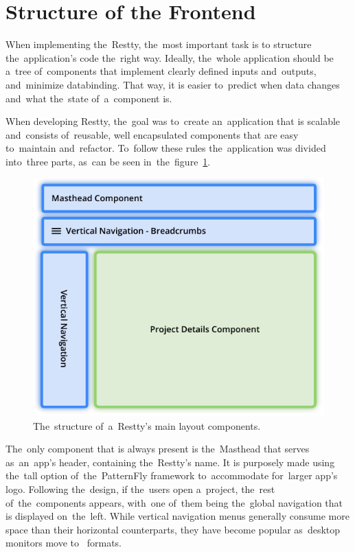 \section{Structure of the Frontend}
When implementing the~Restty, the~most important task is to structure the~application's code
the~right way. Ideally, the~whole application should be a~tree of~components that implement clearly
defined inputs and~outputs, and~minimize  databinding. That way, it is easier to~predict
when data changes and~what the~state of~a~component is.

When developing Restty, the~goal was to~create an~application that is scalable and~consists
of~reusable, well encapsulated components that are easy to~maintain and~refactor. To~follow these
rules the~application was divided into~three parts, as~can be seen in~the~figure~\ref{fig-layout}.

\begin{figure}[!hbt]
	\centering
	\includegraphics[scale=0.7]{./figures/layout.pdf}
	\caption{The~structure of~a~Restty's main layout components.}
	\label{fig-layout}
\end{figure}

The~only component that is always present is the~Masthead that serves as~an~app's header, containing
the~Restty's name. It is purposely made using the~tall option of~the~PatternFly framework to~accommodate
for~larger app's logo. Following the~design, if the~users open a~project, the~rest of~the~components appears, 
with~one of~them being the~global navigation that is displayed on~the~left. While vertical navigation menus
generally consume more space than their horizontal counterparts, they have become popular as~desktop monitors
move to~ formats. 

